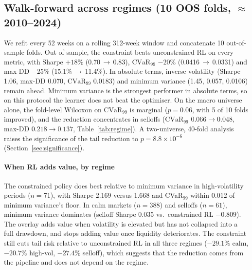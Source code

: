 \documentclass[sigconf]{acmart}
\begin{document}
\subsection{Walk-forward across regimes (10 OOS folds, \texorpdfstring{$\approx$}{about }2010--2024)}
We refit every 52 weeks on a rolling 312-week window and concatenate 10 out-of-sample
folds. Out of sample, the constraint beats unconstrained RL on every metric, with Sharpe $+18\%$
(0.70\,$\to$\,0.83), $\mathrm{CVaR}_{99}$ $-20\%$ (0.0416\,$\to$\,0.0331) and max-DD $-25\%$
(15.1\%\,$\to$\,11.4\%). In absolute terms, inverse volatility (Sharpe 1.06, max-DD 0.070,
$\mathrm{CVaR}_{99}$ 0.0183) and minimum variance (1.45, 0.057, 0.0106) remain ahead. Minimum variance is the
strongest performer in absolute terms, so on this protocol the learner does not beat the
optimiser. On the
macro universe alone, the fold-level Wilcoxon on $\mathrm{CVaR}_{99}$ is marginal ($p=0.06$, with
5 of 10 folds improved), and the reduction concentrates in selloffs ($\mathrm{CVaR}_{99}$
$0.066\!\to\!0.048$, max-DD $0.218\!\to\!0.137$, Table~\ref{tab:regime}). A two-universe, 40-fold analysis raises the significance of the tail reduction to
$p=8.8\times10^{-6}$ (Section~\ref{sec:significance}).

\paragraph{When RL adds value, by regime}
The constrained policy does best relative to minimum variance in high-volatility periods
($n{=}71$), with Sharpe $2.169$ versus $1.668$ and CVaR$_{99}$ within $0.012$ of minimum variance's
floor. In calm markets ($n{=}388$) and selloffs ($n{=}61$), minimum variance dominates (selloff
Sharpe $0.035$ vs.\ constrained RL $-0.809$). The overlay adds value when volatility is
elevated but has not collapsed into a full drawdown, and stops adding value once liquidity
deteriorates. The constraint still cuts tail risk relative to unconstrained RL in all three
regimes ($-29.1\%$ calm, $-20.7\%$ high-vol, $-27.4\%$ selloff), which suggests that the
reduction comes from the pipeline and does not depend on the regime.
\end{document}
